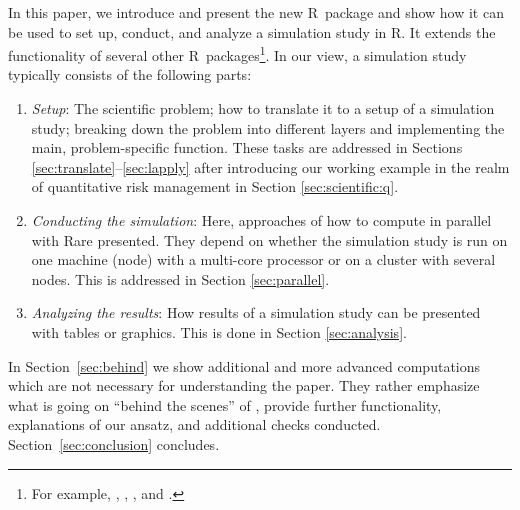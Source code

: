 \documentclass[article]{jss}
\newcommand*{\R}{\textsf{R}}
\theoremstyle{mythmstyle}%
\begin{document}
In this paper, we introduce and present the new \R\ package  and
show how it can be used to set up, conduct, and analyze a simulation study in \R. It
extends the functionality of several other \R\ packages\footnote{For example,
, , , and .}. In our
view, a simulation
study typically consists of the following parts:
\begin{enumerate}
\item\label{Step1} \emph{Setup}: The scientific problem; how to translate it to
  a setup of a simulation study; breaking down the problem into different layers
  and implementing the main, problem-specific function. These tasks are addressed
  in Sections \ref{sec:translate}--\ref{sec:lapply} after introducing our
  working example in the realm of quantitative risk management in Section
  \ref{sec:scientific:q}.
\item \emph{Conducting the simulation}: Here, approaches of how to compute in parallel
  with \R are presented. They depend on whether the simulation study is run on one machine
  (node) with a multi-core processor or on a cluster with several nodes. This is
  addressed in Section \ref{sec:parallel}.
\item\label{Step3} \emph{Analyzing the results}: How results of a simulation
  study can be presented with tables or graphics. This is done in
  Section \ref{sec:analysis}.
\end{enumerate}
In Section~\ref{sec:behind} we show additional and more advanced
computations which are not necessary for understanding the paper. They rather
emphasize what is going on ``behind the scenes'' of , provide further
functionality, explanations of our ansatz, and additional checks
conducted. Section~\ref{sec:conclusion} concludes.
\end{document}
